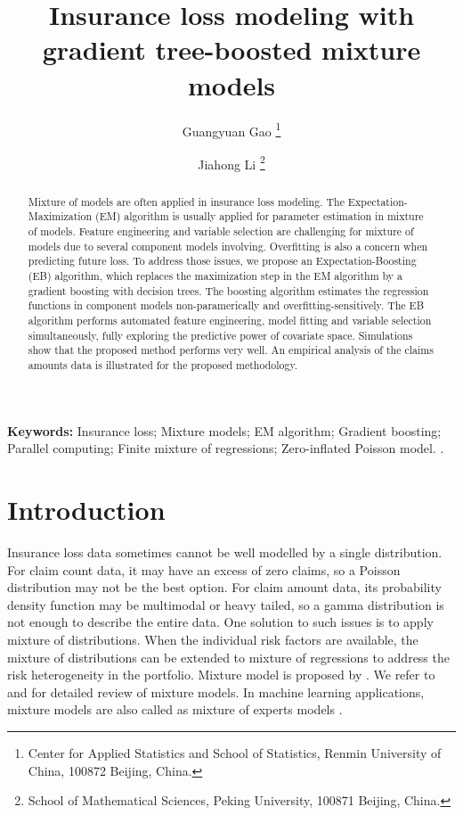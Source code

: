 \documentclass[11pt]{article}
\title{Insurance loss modeling with gradient tree-boosted mixture models}
\author{Guangyuan Gao \footnote{Center for Applied Statistics and School of Statistics, Renmin University of China, 100872 Beijing, China.} \and Jiahong Li \footnote{School of Mathematical Sciences, Peking University, 100871 Beijing, China.} }
\numberwithin{equation}{section}
\begin{document}
\maketitle

\begin{abstract}
Mixture of models are often applied in insurance loss modeling. 
The Expectation-Maximization (EM) algorithm is usually applied for parameter estimation in mixture of models. 
Feature engineering and variable selection are challenging for mixture of models due to several component models involving. 
Overfitting is also a concern when predicting future loss. 
To address those issues, we propose an Expectation-Boosting (EB) algorithm, 
which replaces the maximization step in the EM algorithm by a gradient boosting with decision trees. 
The boosting algorithm estimates the regression functions in component models non-paramerically and overfitting-sensitively. 
The EB algorithm performs automated feature engineering, model fitting and variable selection simultaneously, 
fully exploring the predictive power of covariate space.
Simulations show that the proposed method performs very well.
An empirical analysis of the claims amounts data is illustrated for the proposed methodology. 

\end{abstract}

{\bf Keywords:} Insurance loss; Mixture models; EM algorithm; Gradient boosting; Parallel computing; Finite mixture of regressions; Zero-inflated Poisson model. .


\section{Introduction}

Insurance loss data sometimes cannot be well modelled by a single distribution.
For claim count data, it may have an excess of zero claims, so a Poisson distribution may not be the best option.
For claim amount data, its probability density function may be multimodal or heavy tailed, so a gamma distribution is not enough to describe the entire data.
One solution to such issues is to apply mixture of distributions.
When the individual risk factors are available, the mixture of distributions can be extended to mixture of regressions to address the risk heterogeneity in the portfolio.
Mixture model is proposed by \citet{goldfeld1973markov}.
We refer to \citet{lindsay1995mixture} and \citet{peel2000finite} for detailed review of mixture models.
In machine learning applications, mixture models are also called as mixture of experts models \citep{jacobs1991adaptive,jiang1999hierarchical}.
\end{document}
